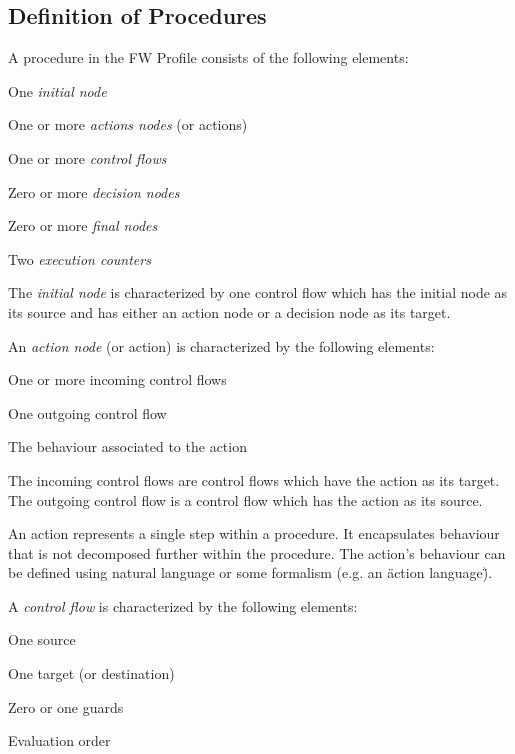 \subsection{Definition of Procedures}
A procedure in the FW Profile consists of the following elements:

\begin{fw_itemize}
\item One \emph{initial node}
\item One or more \emph{actions nodes} (or actions)
\item One or more \emph{control flows}
\item Zero or more \emph{decision nodes}
\item Zero or more \emph{final nodes}
\item Two \emph{execution counters}
\end{fw_itemize}

The \emph{initial node} is characterized by one control flow which has the initial node as its source
and has either an action node or a decision node as its target.

An \emph{action node} (or action) is characterized by the following elements:

\begin{fw_itemize}
\item One or more incoming control flows
\item One outgoing control flow
\item The behaviour associated to the action
\end{fw_itemize}

The incoming control flows are control flows which have the action as its target. The outgoing
control flow is a control flow which has the action as its source.

An action represents a single step within a procedure. It encapsulates behaviour that is not
decomposed further within the procedure. The action's behaviour can be defined using natural
language or some formalism (e.g. an \"action language\").

A \emph{control flow} is characterized by the following elements:

\begin{fw_itemize}
\item One source
\item One target (or destination)
\item Zero or one guards
\item Evaluation order
\end{fw_itemize}

